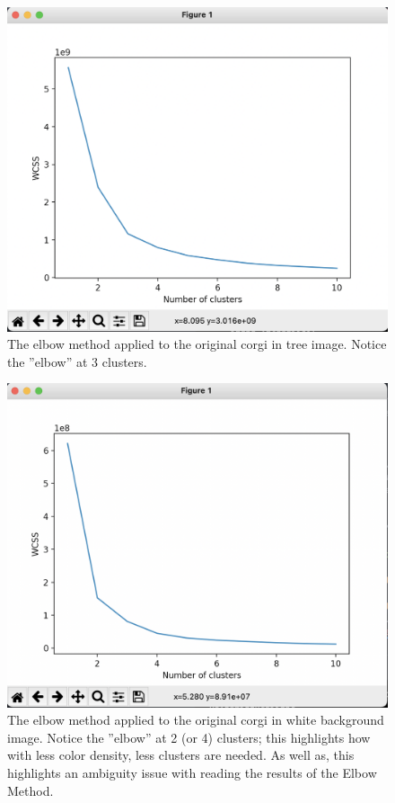 \documentclass[10pt,twocolumn]{article}
\begin{document}
\begin{figure}
  \centering
  \includegraphics[scale=0.15]{corgi-tree-elbow.png}
  \vspace{20px}
  \caption{The elbow method applied to the original corgi in tree image. Notice the ”elbow” at 3 clusters.}
  \label{ctree:elbow}
\end{figure}

\begin{figure}
  \centering
  \includegraphics[scale=0.2]{corgi-white-elbow.png}
  \vspace{20px}
  \caption{The elbow method applied to the original corgi in white background image. Notice the ”elbow” at 2 (or 4) clusters; this highlights how with less color density, less clusters are needed. As well as, this highlights an ambiguity issue with reading the results of the Elbow Method.}
  \label{cwhite:elbow}
\end{figure}
\end{document}
